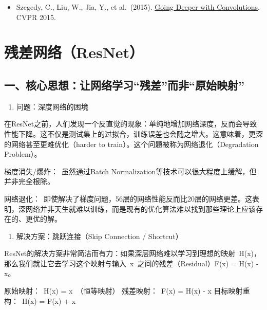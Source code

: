 \begin{itemize}
\tightlist
\item
  Szegedy, C., Liu, W., Jia, Y., et al.~(2015). \href{https://arxiv.org/abs/1409.4842}{Going Deeper with Convolutions}. CVPR 2015.
\end{itemize}

\clearpage

\hypertarget{ux6b8bux5deeux7f51ux7edcresnet}{%
\section{残差网络（ResNet）}\label{ux6b8bux5deeux7f51ux7edcresnet}}

\hypertarget{ux4e00ux6838ux5fc3ux601dux60f3ux8ba9ux7f51ux7edcux5b66ux4e60ux6b8bux5deeux800cux975eux539fux59cbux6620ux5c04}{%
\subsection{一、核心思想：让网络学习``残差''而非``原始映射''}\label{ux4e00ux6838ux5fc3ux601dux60f3ux8ba9ux7f51ux7edcux5b66ux4e60ux6b8bux5deeux800cux975eux539fux59cbux6620ux5c04}}

\begin{enumerate}
\def\labelenumi{\arabic{enumi}.}
\tightlist
\item
  问题：深度网络的困境
\end{enumerate}

在ResNet之前，人们发现一个反直觉的现象：单纯地增加网络深度，反而会导致性能下降。这不仅是测试集上的过拟合，训练误差也会随之增大。这意味着，更深的网络甚至更难优化（harder to train）。这个问题被称为网络退化（Degradation Problem）。

梯度消失/爆炸：~虽然通过Batch Normalization等技术可以很大程度上缓解，但并非完全根除。

网络退化：~即使解决了梯度问题，56层的网络性能反而比20层的网络更差。这表明，深网络并非天生就难以训练，而是现有的优化算法难以找到那些理论上应该存在的、更优的解。

\begin{enumerate}
\def\labelenumi{\arabic{enumi}.}
\setcounter{enumi}{1}
\tightlist
\item
  解决方案：跳跃连接（Skip Connection / Shortcut）
\end{enumerate}

ResNet的解决方案非常简洁而有力：如果深层网络难以学习到理想的映射~H(x)，那么我们就让它去学习这个映射与输入~x~之间的残差（Residual）F(x) = H(x) - x。

原始映射：~H(x) = x~（恒等映射）
残差映射：~F(x) = H(x) - x
目标映射重构：~H(x) = F(x) + x

